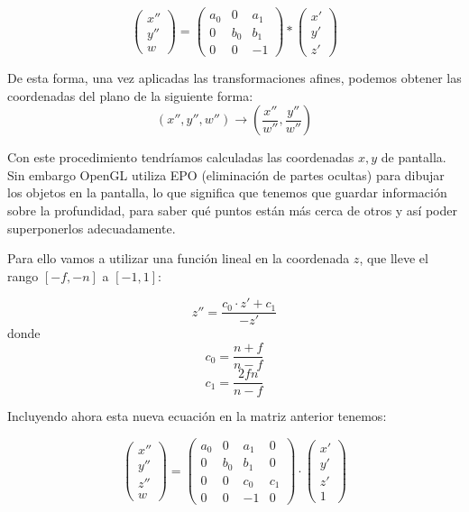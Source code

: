 \documentclass[a4paper,11pt, oneside]{book}
\begin{document}
$$\begin{pmatrix}
x''\\
y''\\
w
\end{pmatrix}=
\begin{pmatrix}
	a_0 & 0&a_1\\
	0&b_0&b_1\\
	0&0&-1
\end{pmatrix}*
\begin{pmatrix}
x'\\
y'\\
z'
\end{pmatrix}
$$


De esta forma, una vez aplicadas las transformaciones afines, podemos obtener las coordenadas del plano de la siguiente forma:
\begin{equation}
(x'',y'',w'') \rightarrow (\frac{x''}{w''}, \frac{y''}{w''})
\end{equation}


Con este procedimiento tendríamos calculadas las coordenadas $x,y$ de pantalla. Sin embargo OpenGL utiliza EPO (eliminación de partes ocultas) para dibujar los objetos en la pantalla, lo que significa que tenemos que guardar información sobre la profundidad, para saber qué puntos están más cerca de otros y así poder superponerlos adecuadamente. 

Para ello vamos a  utilizar una función lineal en la coordenada $z$, que lleve el rango $[-f,-n]$ a $[-1,1]$:

\begin{equation}
z'' = \frac{c_0\cdot z'+c_1}{-z'}
\end{equation}
donde
\begin{equation}
c_0 = \frac{n+f}{n-f}
\end{equation}
\begin{equation}
c_1 = \frac{2fn}{n-f}
\end{equation}

Incluyendo ahora esta nueva ecuación en la matriz anterior tenemos:

$$\begin{pmatrix}
x''\\
y''\\
z'' \\
w
\end{pmatrix}=
\begin{pmatrix}
a_0 & 0&a_1&0\\
0&b_0&b_1&0\\
0&0&c_0&c_1\\
0&0&-1&0
\end{pmatrix}\cdot 
\begin{pmatrix}
x'\\
y'\\
z'\\
1
\end{pmatrix}
$$
\end{document}
